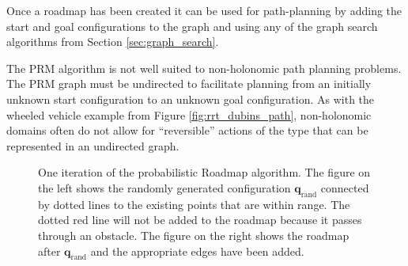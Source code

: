 Once a roadmap has been created it can be used for path-planning by
adding the start and goal configurations to the graph and using any of
the graph search algorithms from Section \ref{sec:graph_search}.

The PRM algorithm is not well suited to non-holonomic path
planning problems.  The PRM graph must be undirected to facilitate
planning from an initially unknown start configuration to an unknown
goal configuration.  As with the wheeled vehicle example from Figure
\ref{fig:rrt_dubins_path}, non-holonomic domains often do not allow
for ``reversible'' actions of the type that can be represented in an
undirected graph.

\begin{figure}
\begin{center}
 \hspace{.5em}
\end{center}
\caption{One iteration of the probabilistic Roadmap algorithm.  The
  figure on the left shows the randomly generated configuration
  $\mathbf{q}_{\text{rand} }$ connected by dotted lines to the
  existing points that are within range. The dotted red line will not
  be added to the roadmap because it passes through an obstacle.  The
  figure on the right shows the roadmap after $\mathbf{q}_{\text{rand}
  }$ and the appropriate edges have been added.}
\label{fig:rrt_iteration}
\end{figure}


